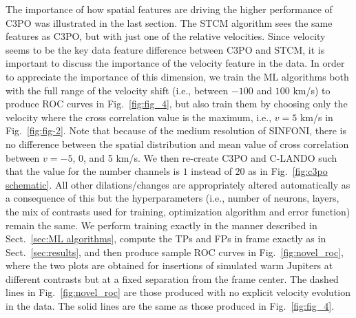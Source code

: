 \documentclass{aa}
\begin{document}
The importance of how spatial features are driving the higher performance of C3PO was illustrated in the last section. The STCM algorithm sees the same features as C3PO, but with just one of the relative velocities.
Since velocity seems to be the key data feature difference between C3PO and STCM, it is important to discuss the importance of the velocity feature in the data. 
In order to appreciate the importance of this dimension, we train the ML algorithms both with the full range of the velocity shift (i.e., between $-100$ and $100$ km/s) to produce ROC curves in Fig.~\ref{fig:fig_4}, but also train them by choosing only the velocity where the cross correlation value is the maximum, i.e., $v=5$ km/s in Fig.~\ref{fig:fig-2}.
Note that because of the medium resolution of SINFONI, there is no difference between the spatial distribution and mean value of cross correlation between $v=-5$, 0, and 5 km/s. 
We then re-create C3PO and C-LANDO such that the value for the number channels is $1$ instead of $20$ as in Fig.~\ref{fig:c3po schematic}.
All other dilations/changes are appropriately altered automatically as a consequence of this but the hyperparameters (i.e., number of neurons, layers, the mix of contrasts used for training, optimization algorithm and error function) remain the same.
We perform training exactly in the manner described in Sect.~\ref{sec:ML algorithms}, compute the TPs and FPs in frame exactly as in Sect.~\ref{sec:results}, and then produce sample ROC curves in Fig.~\ref{fig:novel_roc}, where the two plots are obtained for insertions of simulated warm Jupiters at different contrasts but at a fixed separation from the frame center.
The dashed lines in Fig.~\ref{fig:novel_roc} are those produced with no explicit velocity evolution in the data.
The solid lines are the same as those produced in Fig.~\ref{fig:fig_4}.
\end{document}
